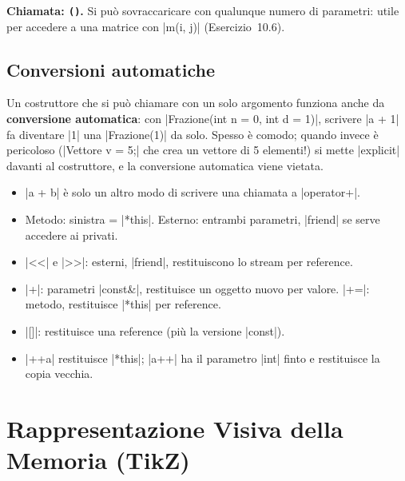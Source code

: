 \textbf{Chiamata: \texttt{()}.} Si può sovraccaricare con qualunque numero di parametri:
utile per accedere a una matrice con \cc|m(i, j)| (Esercizio~10.6).

\subsection*{Conversioni automatiche}

Un costruttore che si può chiamare con un solo argomento funziona anche da
\textbf{conversione automatica}: con \cc|Frazione(int n = 0, int d = 1)|, scrivere
\cc|a + 1| fa diventare \cc|1| una \cc|Frazione(1)| da solo. Spesso è comodo; quando
invece è pericoloso (\cc|Vettore v = 5;| che crea un vettore di 5 elementi!) si mette
\cc|explicit| davanti al costruttore, e la conversione automatica viene vietata.

\begin{inparole}
\begin{itemize}
  \item \cc|a + b| è solo un altro modo di scrivere una chiamata a \cc|operator+|.
  \item Metodo: sinistra = \cc|*this|. Esterno: entrambi parametri, \cc|friend| se
        serve accedere ai privati.
  \item \cc|<<| e \cc|>>|: esterni, \cc|friend|, restituiscono lo stream per reference.
  \item \cc|+|: parametri \cc|const&|, restituisce un oggetto nuovo per valore.
        \cc|+=|: metodo, restituisce \cc|*this| per reference.
  \item \cc|[]|: restituisce una reference (più la versione \cc|const|).
  \item \cc|++a| restituisce \cc|*this|; \cc|a++| ha il parametro \cc|int| finto e
        restituisce la copia vecchia.
\end{itemize}
\end{inparole}

\section{Rappresentazione Visiva della Memoria (TikZ)}

